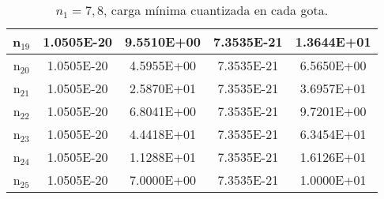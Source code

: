 \documentclass{article}
\begin{document}
\begin{enumerate}
\begin{table}[h!]
\begin{tabular}{|c|c|c|c|c|}
       \hline       
       n$_{19}$  & 1.0505E-20 & 9.5510E+00 & 7.3535E-21 & 1.3644E+01\\
       \hline       
       n$_{20}$  & 1.0505E-20 & 4.5955E+00 & 7.3535E-21 & 6.5650E+00\\
       \hline       
       n$_{21}$  & 1.0505E-20 & 2.5870E+01 & 7.3535E-21 & 3.6957E+01\\
       \hline       
       n$_{22}$  & 1.0505E-20 & 6.8041E+00 & 7.3535E-21 & 9.7201E+00\\
       \hline       
       n$_{23}$  & 1.0505E-20 & 4.4418E+01 & 7.3535E-21 & 6.3454E+01\\
       \hline       
       n$_{24}$  & 1.0505E-20 & 1.1288E+01 & 7.3535E-21 & 1.6126E+01\\
       \hline       
       n$_{25}$  & 1.0505E-20 & 7.0000E+00 & 7.3535E-21 & 1.0000E+01\\
       \hline

    \end{tabular}
    \caption{$n_{1}=7,8$, carga mínima cuantizada en cada gota.}
    \label{tab:my_label}
\end{table}




\end{enumerate}
\end{document}
